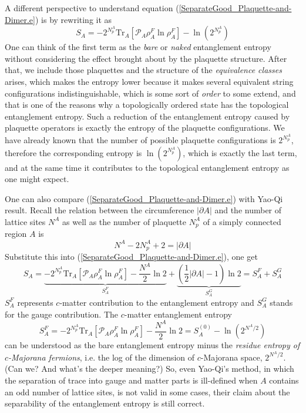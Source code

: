 \documentclass[12font]{article}
\theoremstyle{definition}
\numberwithin{equation}{section}
\newcommand{\lr}[1]{\left(  #1  \right)}
\newcommand{\lrm}[1]{\left[  #1  \right]}
\newcommand{\abs}[1]{\left|  #1  \right|}
\newcommand{\de}{\partial}
\newcommand{\mrm}[1]{\mathrm{#1}}
\newcommand{\alert}[1]{{\color{red}#1}}
\newcommand{\Tr}{\mrm{Tr}}
\begin{document}
A different perspective to understand equation (\ref{SeparateGood_Plaquette-and-Dimer.e}) is by rewriting it as
\[
S_A = -2^{N_p^A}\Tr_A\lrm{\mathcal{P}_A\rho_A^F\ln\rho_A^F} - \ln\lr{2^{N_p^A}}
\]
One can think of the first term as the \emph{bare} or \emph{naked} entanglement entropy without considering the effect brought about by the plaquette structure. After that, we include those plaquettes and the structure of the \emph{equivalence classes} arises, which makes the entropy lower because it makes several equivalent string configurations indistinguishable, which is some sort of \emph{order} to some extend, and that is one of the reasons why a topologically ordered state has the topological entanglement entropy. Such a reduction of the entanglement entropy caused by plaquette operators is exactly the entropy of the plaquette configurations. We have already known that the number of possible plaquette configurations is $2^{N_p^A}$, therefore the corresponding entropy is $\ln\lr{2^{N_p^A}}$, which is exactly the last term, and at the same time it contributes to the topological entanglement entropy as one might expect.

One can also compare (\ref{SeparateGood_Plaquette-and-Dimer.e}) with Yao-Qi result. Recall the relation between the circumference $\abs{\de A}$ and the number of lattice sites $N^A$ as well as the number of plaquette $N^A_p$ of a simply connected region $A$ is 
\[
N^A-2N_p^A+2 = \abs{\de A}
\]
Substitute this into (\ref{SeparateGood_Plaquette-and-Dimer.e}), one get
\begin{equation}\label{ee-separation.e}
  S_A = \underbrace{-2^{N_p^A}\Tr_A\lrm{\mathcal{P}_A\rho_A^F\ln\rho_A^F} - \frac{N^A}{2}\ln 2}_{S_A^F} + \underbrace{\lr{\frac{1}{2}\abs{\de A} - 1}\ln 2}_{S_A^G} = S_A^F + S_A^G
\end{equation}
$S_A^F$ represents $c$-matter contribution to the entanglement entropy and $S_A^G$ stands for the gauge contribution. The $c$-matter entanglement entropy 
\[
S_A^F = -2^{N_p^A}\Tr_A\lrm{\mathcal{P}_A\rho_A^F\ln\rho_A^F} - \frac{N^A}{2}\ln 2 = S_A^{(0)} - \ln\lr{2^{N^A/2}}
\]
can be understood as the bare entanglement entropy minus the \emph{residue entropy of $c$-Majorana fermions}, i.e. the log of the dimension of $c$-Majorana space, $2^{N^A/2}$. \alert{(Can we? And what's the deeper meaning?)} So, even Yao-Qi's method, in which the separation of trace into gauge and matter parts is ill-defined when $A$ contains an odd number of lattice sites, is not valid in some cases, their claim about the separability of the entanglement entropy is still correct.
\end{document}
